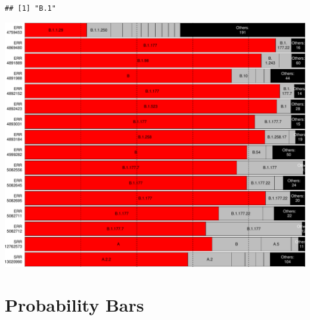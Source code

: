 \documentclass[]{article}
\begin{document}
\begin{verbatim}
## [1] "B.1"
\end{verbatim}

\includegraphics{pangolin_results_report_d_files/figure-latex/pareto-1.pdf}

\hypertarget{probability-bars}{%
\section{Probability Bars}\label{probability-bars}}
\end{document}
